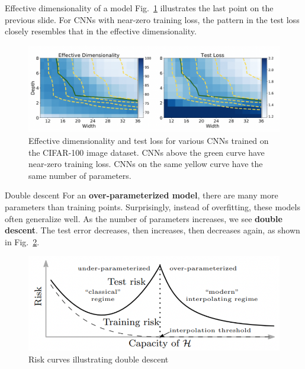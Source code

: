 \documentclass{beamer}
\begin{document}
\begin{frame}{Effective dimensionality of a model}
    Fig.~\ref{fig:effective_dimensionality_and_test_loss} illustrates the last point on the previous slide. For CNNs with near-zero training loss, the pattern in the test loss closely resembles that in the effective dimensionality.
    \begin{figure}
        \centering
        \includegraphics[width=\textwidth]{effective_dimensionality_and_test_loss}
        \caption{Effective dimensionality and test loss for various CNNs trained on the CIFAR-100 image dataset. CNNs above the green curve have near-zero training loss. CNNs on the same yellow curve have the same number of parameters.}
        \label{fig:effective_dimensionality_and_test_loss}
    \end{figure}    
\end{frame}

\begin{frame}{Double descent}
    For an \textbf{over-parameterized model}, there are many more parameters than training points. Surprisingly, instead of overfitting, these models often generalize well. As the number of parameters increases, we see \textbf{double descent}. The test error decreases, then increases, then decreases again, as shown in Fig.~\ref{fig:double_descent}.
    
    \begin{figure}
        \centering
        \includegraphics[width=\textwidth]{double_descent}
        \caption{Risk curves illustrating double descent}
        \label{fig:double_descent}
    \end{figure}
\end{frame}
\end{document}
